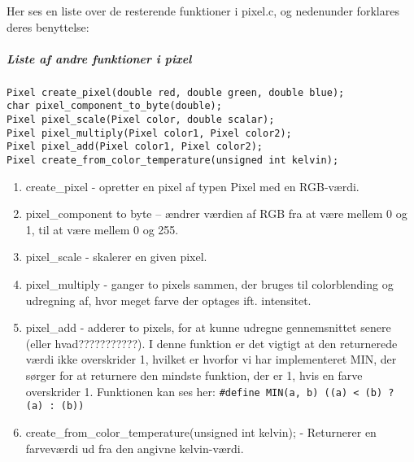 Her ses en liste over de resterende funktioner i pixel.c, og nedenunder forklares deres benyttelse:

\subparagraph{Liste af andre funktioner i pixel}
\begin{lstlisting}[style=Cstyle, caption=Andre funktioner i pixel]
Pixel create_pixel(double red, double green, double blue);
char pixel_component_to_byte(double);
Pixel pixel_scale(Pixel color, double scalar);
Pixel pixel_multiply(Pixel color1, Pixel color2);
Pixel pixel_add(Pixel color1, Pixel color2);
Pixel create_from_color_temperature(unsigned int kelvin);
\end{lstlisting}

\begin{enumerate}

  \item create\_pixel - opretter en pixel af typen Pixel med en RGB-værdi.
  \item pixel\_component to byte – ændrer værdien af RGB fra at være mellem 0 og 1, til at være mellem 0 og 255.
  \item pixel\_scale - skalerer en given pixel.
  \item pixel\_multiply - ganger to pixels sammen, der bruges til colorblending og udregning af, hvor meget farve der optages ift. intensitet.
  \item pixel\_add - adderer to pixels, for at kunne udregne gennemsnittet senere (eller hvad???????????). I denne funktion er det vigtigt at den returnerede værdi ikke overskrider 1, hvilket er hvorfor vi har implementeret MIN, der sørger for at returnere den mindste funktion, der er 1, hvis en farve overskrider 1. Funktionen kan ses her:
  \lstinline$#define MIN(a, b) ((a) < (b) ? (a) : (b))$
  \item create\_from\_color\_temperature(unsigned int kelvin); - Returnerer en farveværdi ud fra den angivne kelvin-værdi.

\end{enumerate}

